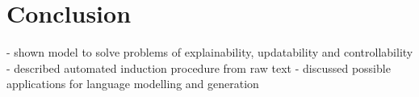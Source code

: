\chapter{Conclusion}

- shown model to solve problems of explainability, updatability and controllability
- described automated induction procedure from raw text
- discussed possible applications for language modelling and generation
